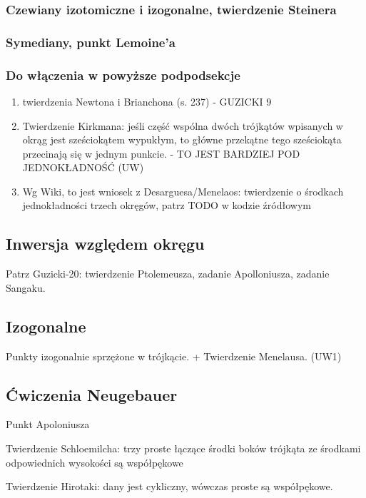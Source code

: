 \subsubsection{Czewiany izotomiczne i izogonalne, twierdzenie Steinera}
\subsubsection{Symediany, punkt Lemoine'a}


\subsubsection{Do włączenia w powyższe podpodsekcje}
\begin{enumerate}
    \item twierdzenia Newtona i Brianchona (s. 237) - GUZICKI 9
    \item Twierdzenie Kirkmana: jeśli część wspólna dwóch trójkątów wpisanych w okrąg jest sześciokątem wypukłym, to główne przekątne tego sześciokąta przecinają się w jednym punkcie. - TO JEST BARDZIEJ POD JEDNOKŁADNOŚĆ (UW)
    \item Wg Wiki, to jest wniosek z Desarguesa/Menelaos: twierdzenie o środkach jednokładności trzech okręgów, patrz TODO w kodzie źródłowym %
\end{enumerate}

\subsection{Inwersja względem okręgu}
Patrz Guzicki-20: twierdzenie Ptolemeusza, zadanie Apolloniusza, zadanie Sangaku.

\subsection{Izogonalne}
Punkty izogonalnie sprzężone w trójkącie. + Twierdzenie Menelausa. (UW1)

\subsection{Ćwiczenia Neugebauer}
Punkt Apoloniusza

Twierdzenie Schloemilcha: trzy proste łączące środki boków trójkąta ze środkami odpowiednich wysokości są współpękowe %

Twierdzenie Hirotaki: dany jest cykliczny, wówczas proste są współpękowe.